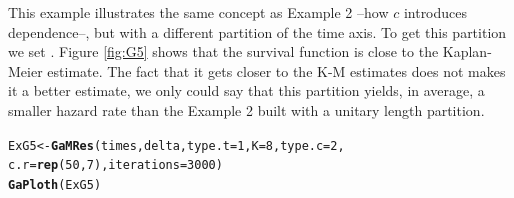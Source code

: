 \documentclass[letterpaper]{article}\usepackage[]{graphicx}\usepackage[]{xcolor}
\makeatletter
\newcommand{\hlnum}[1]{\textcolor[rgb]{0.686,0.059,0.569}{#1}}%
\newcommand{\hlstd}[1]{\textcolor[rgb]{0.345,0.345,0.345}{#1}}%
\newcommand{\hlkwb}[1]{\textcolor[rgb]{0.69,0.353,0.396}{#1}}%
\newcommand{\hlkwc}[1]{\textcolor[rgb]{0.333,0.667,0.333}{#1}}%
\newcommand{\hlkwd}[1]{\textcolor[rgb]{0.737,0.353,0.396}{\textbf{#1}}}%
\newenvironment{kframe}{%
 \def\at@end@of@kframe{}%
 \ifinner\ifhmode%
  \def\at@end@of@kframe{\end{minipage}}%
  \begin{minipage}{\columnwidth}%
 \fi\fi%
 \def\FrameCommand##1{\hskip\@totalleftmargin \hskip-\fboxsep
 \colorbox{shadecolor}{##1}\hskip-\fboxsep
     \hskip-\linewidth \hskip-\@totalleftmargin \hskip\columnwidth}%
 \MakeFramed {\advance\hsize-\width
   \@totalleftmargin\z@ \linewidth\hsize
   \@setminipage}}%
 {\par\unskip\endMakeFramed%
 \at@end@of@kframe}
\newenvironment{knitrout}{}{} %
\makeatother
\begin{document}
This example illustrates the same concept as Example 2 --how $c$ introduces dependence--, but with a different partition of the time axis. To get this partition we set . Figure \ref{fig:G5} shows that the survival function is close to the Kaplan-Meier estimate. The fact that it gets closer to the K-M estimates does not makes it a better estimate, we only could say that this partition yields, in average, a smaller hazard rate than the Example 2 built with a unitary length partition.

\begin{knitrout}
\color{fgcolor}\begin{kframe}
\begin{alltt}
\hlstd{ExG5} \hlkwb{<-} \hlkwd{GaMRes}\hlstd{(times, delta,} \hlkwc{type.t} \hlstd{=} \hlnum{1}\hlstd{,} \hlkwc{K} \hlstd{=} \hlnum{8}\hlstd{,} \hlkwc{type.c} \hlstd{=} \hlnum{2}\hlstd{,}
               \hlkwc{c.r} \hlstd{=} \hlkwd{rep}\hlstd{(}\hlnum{50}\hlstd{,} \hlnum{7}\hlstd{),} \hlkwc{iterations} \hlstd{=} \hlnum{3000}\hlstd{)}
\hlkwd{GaPloth}\hlstd{(ExG5)}
\end{alltt}
\end{kframe}
\end{knitrout}
\end{document}
